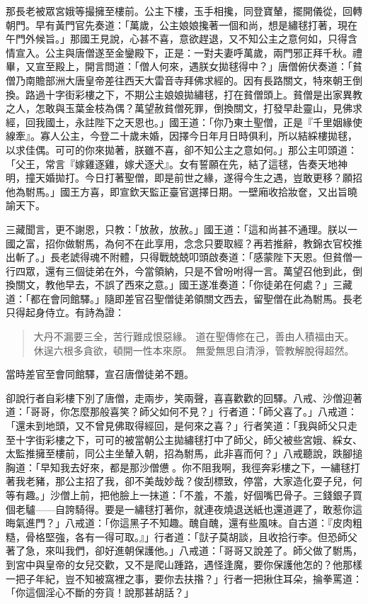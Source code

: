 那長老被眾宮娥等撮擁至樓前。公主下樓，玉手相攙，同登寶輦，擺開儀從，回轉朝門。早有黃門官先奏道：「萬歲，公主娘娘攙著一個和尚，想是繡毬打著，現在午門外候旨。」那國王見說，心甚不喜，意欲趕退，又不知公主之意何如，只得含情宣入。公主與唐僧遂至金鑾殿下，正是：一對夫妻呼萬歲，兩門邪正拜千秋。禮畢，又宣至殿上，開言問道：「僧人何來，遇朕女拋毬得中？」唐僧俯伏奏道：「貧僧乃南贍部洲大唐皇帝差往西天大雷音寺拜佛求經的。因有長路關文，特來朝王倒換。路過十字街彩樓之下，不期公主娘娘拋繡毬，打在貧僧頭上。貧僧是出家異教之人，怎敢與玉葉金枝為偶？萬望赦貧僧死罪，倒換關文，打發早赴靈山，見佛求經，回我國土，永註陛下之天恩也。」國王道：「你乃東土聖僧，正是『千里姻緣使線牽』。寡人公主，今登二十歲未婚，因擇今日年月日時俱利，所以結綵樓拋毬，以求佳偶。可可的你來拋著，朕雖不喜，卻不知公主之意如何。」那公主叩頭道：「父王，常言『嫁雞逐雞，嫁犬逐犬』。女有誓願在先，結了這毬，告奏天地神明，撞天婚拋打。今日打著聖僧，即是前世之緣，遂得今生之遇，豈敢更移？願招他為駙馬。」國王方喜，即宣欽天監正臺官選擇日期。一壁廂收拾妝奩，又出旨曉諭天下。

三藏聞言，更不謝恩，只教：「放赦，放赦。」國王道：「這和尚甚不通理。朕以一國之富，招你做駙馬，為何不在此享用，念念只要取經？再若推辭，教錦衣官校推出斬了。」長老諕得魂不附體，只得戰兢兢叩頭啟奏道：「感蒙陛下天恩。但貧僧一行四眾，還有三個徒弟在外，今當領納，只是不曾吩咐得一言。萬望召他到此，倒換關文，教他早去，不誤了西來之意。」國王遂准奏道：「你徒弟在何處？」三藏道：「都在會同館驛。」隨即差官召聖僧徒弟領關文西去，留聖僧在此為駙馬。長老只得起身侍立。有詩為證：
\begin{quote}
大丹不漏要三全，苦行難成恨惡緣。
道在聖傳修在己，善由人積福由天。
休逞六根多貪欲，頓開一性本來原。
無愛無思自清淨，管教解脫得超然。
\end{quote}

當時差官至會同館驛，宣召唐僧徒弟不題。

卻說行者自彩樓下別了唐僧，走兩步，笑兩聲，喜喜歡歡的回驛。八戒、沙僧迎著道：「哥哥，你怎麼那般喜笑？師父如何不見？」行者道：「師父喜了。」八戒道：「還未到地頭，又不曾見佛取得經回，是何來之喜？」行者笑道：「我與師父只走至十字街彩樓之下，可可的被當朝公主拋繡毬打中了師父，師父被些宮娥、綵女、太監推擁至樓前，同公主坐輦入朝，招為駙馬，此非喜而何？」八戒聽說，跌腳搥胸道：「早知我去好來，都是那沙僧憊𪬯。你不阻我啊，我徑奔彩樓之下，一繡毬打著我老豬，那公主招了我，卻不美哉妙哉？俊刮標致，停當，大家造化耍子兒，何等有趣。」沙僧上前，把他臉上一抹道：「不羞，不羞，好個嘴巴骨子。三錢銀子買個老驢——自誇騎得。要是一繡毬打著你，就連夜燒退送紙也還道遲了，敢惹你這晦氣進門？」八戒道：「你這黑子不知趣。醜自醜，還有些風味。自古道：『皮肉粗糙，骨格堅強，各有一得可取。』」行者道：「獃子莫胡談，且收拾行李。但恐師父著了急，來叫我們，卻好進朝保護他。」八戒道：「哥哥又說差了。師父做了駙馬，到宮中與皇帝的女兒交歡，又不是爬山踵路，遇怪逢魔，要你保護他怎的？他那樣一把子年紀，豈不知被窩裡之事，要你去扶揝？」行者一把揪住耳朵，掄拳罵道：「你這個淫心不斷的夯貨！說那甚胡話？」

